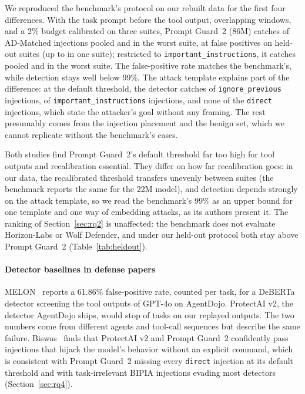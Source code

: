 We reproduced the benchmark's protocol on our rebuilt data for the first four differences. With the task prompt before the tool output, overlapping windows, and a 2\% budget calibrated on three suites, Prompt Guard~2 (86M) catches \CommTaskLoTpr of AD-Matched injections pooled and \CommTaskLoMin in the worst suite, at \CommTaskLoFpr false positives on held-out suites (up to \CommTaskLoMaxFpr in one suite); restricted to \texttt{important\_instructions}, it catches \CommTaskLoII pooled and \CommTaskLoIIMin in the worst suite. The false-positive rate matches the benchmark's, while detection stays well below 99\%. The attack template explains part of the difference: at the default threshold, the detector catches \CommTaskDefaultIgn of \texttt{ignore\_previous} injections, \CommTaskDefaultII of \texttt{important\_instructions} injections, and none of the \texttt{direct} injections, which state the attacker's goal without any framing. The rest presumably comes from the injection placement and the benign set, which we cannot replicate without the benchmark's cases.

Both studies find Prompt Guard~2's default threshold far too high for tool outputs and recalibration essential. They differ on how far recalibration goes: in our data, the recalibrated threshold transfers unevenly between suites (the benchmark reports the same for the 22M model), and detection depends strongly on the attack template, so we read the benchmark's 99\% as an upper bound for one template and one way of embedding attacks, as its authors present it. The ranking of Section~\ref{sec:rq2} is unaffected: the benchmark does not evaluate Horizon-Labs or Wolf Defender, and under our held-out protocol both stay above Prompt Guard~2 (Table~\ref{tab:heldout}).

\paragraph{Detector baselines in defense papers}
MELON~\cite{melon} reports a 61.86\% false-positive rate, counted per task, for a DeBERTa detector screening the tool outputs of GPT-4o on AgentDojo. ProtectAI v2, the detector AgentDojo ships, would stop \CleanPABlock of tasks on our replayed outputs. The two numbers come from different agents and tool-call sequences but describe the same failure. Biswas~\cite{biswas2026} finds that ProtectAI v2 and Prompt Guard~2 confidently pass injections that hijack the model's behavior without an explicit command, which is consistent with Prompt Guard~2 missing every \texttt{direct} injection at its default threshold and with task-irrelevant BIPIA injections evading most detectors (Section~\ref{sec:rq4}).
